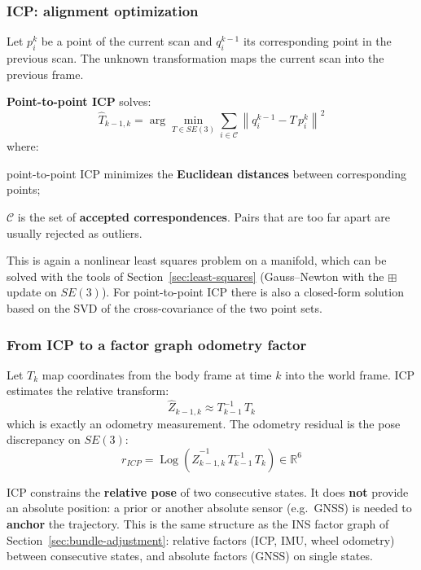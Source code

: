 \subsubsection{ICP: alignment optimization}
Let $p^k_i$ be a point of the current scan and $q^{k-1}_i$ its corresponding point in the previous scan. The unknown transformation maps the current scan into the previous frame.

\textbf{Point-to-point ICP} solves:
\[
\hat T_{k-1,k} = \arg\min_{T \in SE(3)} \sum_{i \in \mathcal{C}} \left\| q^{k-1}_i - T\, p^k_i \right\|^2
\]
where:
\begin{compactitemize}
    \item point-to-point ICP minimizes the \textbf{Euclidean distances} between corresponding points;
    \item $\mathcal{C}$ is the set of \textbf{accepted correspondences}. Pairs that are too far apart are usually rejected as outliers.
\end{compactitemize}
This is again a nonlinear least squares problem on a manifold, which can be solved with the tools of Section~\ref{sec:least-squares} (Gauss--Newton with the $\boxplus$ update on $SE(3)$). For point-to-point ICP there is also a closed-form solution based on the SVD of the cross-covariance of the two point sets.

\subsubsection{From ICP to a factor graph odometry factor}
Let $T_k$ map coordinates from the body frame at time $k$ into the world frame. ICP estimates the relative transform:
\[
\hat Z_{k-1,k} \approx T_{k-1}^{-1}\, T_k
\]
which is exactly an odometry measurement. The odometry residual is the pose discrepancy on $SE(3)$:
\[
\boxed{r_{ICP} = \operatorname{Log}\!\left( \hat Z_{k-1,k}^{-1}\, T_{k-1}^{-1}\, T_k \right) \in \mathbb{R}^6}
\]

\begin{infobox}
ICP constrains the \textbf{relative pose} of two consecutive states. It does \textbf{not} provide an absolute position: a prior or another absolute sensor (e.g.\ GNSS) is needed to \textbf{anchor} the trajectory. This is the same structure as the INS factor graph of Section~\ref{sec:bundle-adjustment}: relative factors (ICP, IMU, wheel odometry) between consecutive states, and absolute factors (GNSS) on single states.
\end{infobox}

